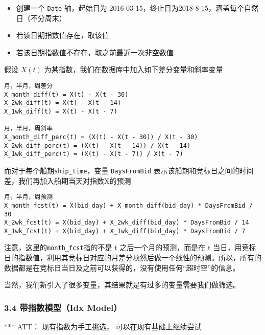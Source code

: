 \documentclass[]{article}
\begin{document}
\begin{itemize}
\item
  创建一个 \texttt{Date} 轴，起始日为
  2016-03-15，终止日为2018-8-15，涵盖每个自然日（不分周末）
\item
  若该日期指数值存在，取该值
\item
  若该日期指数值不存在，取之前最近一次非空数值
\end{itemize}

假设 \(X(t)\) 为某指数，我们在数据库中加入如下差分变量和斜率变量

\begin{verbatim}
月，半月，周差分
X_month_diff(t) = X(t) - X(t - 30)
X_2wk_diff(t) = X(t) - X(t - 14)
X_1wk_diff(t) = X(t) - X(t - 7)

月，半月，周斜率
X_month_diff_perc(t) = (X(t) - X(t - 30)) / X(t - 30)
X_2wk_diff_perc(t) = (X(t) - X(t - 14)) / X(t - 14)
X_1wk_diff_perc(t) = (X(t) - X(t - 7)) / X(t - 7)
\end{verbatim}

而对于每个船期\texttt{ship\_time}，变量 \texttt{DaysFromBid}
表示该船期和竞标日之间的时间差，我们再加入船期当天对指数X的预测

\begin{verbatim}
月，半月，周预测
X_month_fcst(t) = X(bid_day) + X_month_diff(bid_day) * DaysFromBid / 30
X_2wk_fcst(t) = X(bid_day) + X_2wk_diff(bid_day) * DaysFromBid / 14
X_1wk_fcst(t) = X(bid_day) + X_1wk_diff(bid_day) * DaysFromBid / 7
\end{verbatim}

注意，这里的\texttt{month\_fcst}指的不是 t 之后一个月的预测，而是在 t
当日，用竞标日的指数值，利用其竞标日对应的月差分项然后做一个线性的预测。所以，所有的数据都是在竞标日当日及之前可以获得的，没有使用任何``超时空''的信息。

当然，我们新引入了很多变量，其结果就是有过多的变量需要我们做筛选。

\subsubsection{3.4 带指数模型（Idx Model）}\label{idx-model}

*** ATT： 现有指数为手工挑选， 可以在现有基础上继续尝试
\end{document}
